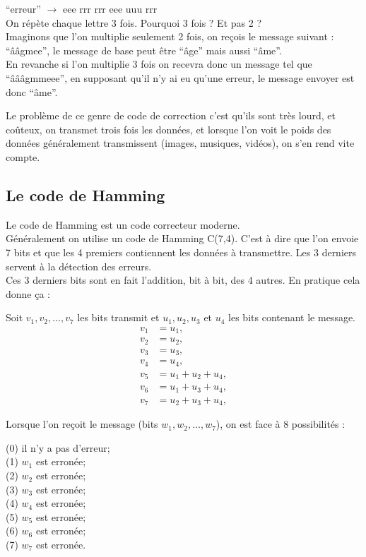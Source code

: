 \hspace{1cm} ``erreur'' $\rightarrow$ eee rrr rrr eee uuu rrr
\\ On répète chaque lettre 3 fois. Pourquoi 3 fois ? Et pas 2 ?
\\ Imaginons que l'on multiplie seulement 2 fois, on reçois le message suivant : ``ââgmee'', le message de base peut être ``âge'' mais aussi ``âme''.
\\ En revanche si l'on multiplie 3 fois on recevra donc un message tel que ``âââgmmeee'', en supposant qu'il n'y ai eu qu'une erreur, le message envoyer est donc ``âme''.

\hspace{1cm} Le problème de ce genre de code de correction c'est qu'ils sont très lourd, et coûteux, on transmet trois fois les données, et lorsque l'on voit le poids des données généralement transmissent (images, musiques, vidéos), on s'en rend vite compte.

\subsection{Le code de Hamming}
\label{sub:Le code de Hamming}

Le code de Hamming est un code correcteur moderne.
\\ Généralement on utilise un code de Hamming C(7,4). C'est à dire que l'on envoie 7 bits et que les 4 premiers contiennent les données à transmettre. Les 3 derniers servent à la détection des erreurs.
\\ Ces 3 derniers bits sont en fait l'addition, bit à bit, des 4 autres. En pratique cela donne ça :

\hspace{1cm} Soit $v_1, v_2, \ldots, v_7$ les bits transmit et $u_1, u_2, u_3$ et $u_4$ les bits contenant le message.
\begin{align*}
  v_1 &= u_1,\\
  v_2 &= u_2,\\
  v_3 &= u_3,\\
  v_4 &= u_4,\\
  v_5 &= u_1 + u_2 + u_4,\\
  v_6 &= u_1 + u_3 + u_4,\\
  v_7 &= u_2 + u_3 + u_4,
\end{align*}

Lorsque l'on reçoit le message (bits $w_1, w_2, \ldots, w_7$), on est face à 8 possibilités :

  (0) il n'y a pas d'erreur; \\
  (1) $w_1$ est erronée; \\
  (2) $w_2$ est erronée; \\
  (3) $w_3$ est erronée; \\
  (4) $w_4$ est erronée; \\
  (5) $w_5$ est erronée; \\
  (6) $w_6$ est erronée; \\
  (7) $w_7$ est erronée.

